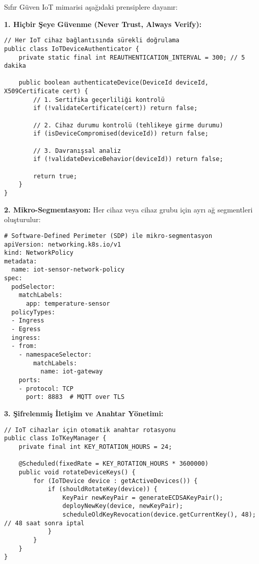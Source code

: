 Sıfır Güven IoT mimarisi aşağıdaki prensiplere dayanır:

\textbf{1. Hiçbir Şeye Güvenme (Never Trust, Always Verify):}
\begin{lstlisting}[breaklines=true,basicstyle=\ttfamily\footnotesize]
// Her IoT cihaz bağlantısında sürekli doğrulama
public class IoTDeviceAuthenticator {
    private static final int REAUTHENTICATION_INTERVAL = 300; // 5 dakika
    
    public boolean authenticateDevice(DeviceId deviceId, X509Certificate cert) {
        // 1. Sertifika geçerliliği kontrolü
        if (!validateCertificate(cert)) return false;
        
        // 2. Cihaz durumu kontrolü (tehlikeye girme durumu)
        if (isDeviceCompromised(deviceId)) return false;
        
        // 3. Davranışsal analiz
        if (!validateDeviceBehavior(deviceId)) return false;
        
        return true;
    }
}
\end{lstlisting}

\textbf{2. Mikro-Segmentasyon:}
Her cihaz veya cihaz grubu için ayrı ağ segmentleri oluşturulur:
\begin{lstlisting}[breaklines=true,basicstyle=\ttfamily\footnotesize]
# Software-Defined Perimeter (SDP) ile mikro-segmentasyon
apiVersion: networking.k8s.io/v1
kind: NetworkPolicy
metadata:
  name: iot-sensor-network-policy
spec:
  podSelector:
    matchLabels:
      app: temperature-sensor
  policyTypes:
  - Ingress
  - Egress
  ingress:
  - from:
    - namespaceSelector:
        matchLabels:
          name: iot-gateway
    ports:
    - protocol: TCP
      port: 8883  # MQTT over TLS
\end{lstlisting}

\textbf{3. Şifrelenmiş İletişim ve Anahtar Yönetimi:}
\begin{lstlisting}[breaklines=true,basicstyle=\ttfamily\footnotesize]
// IoT cihazlar için otomatik anahtar rotasyonu
public class IoTKeyManager {
    private final int KEY_ROTATION_HOURS = 24;
    
    @Scheduled(fixedRate = KEY_ROTATION_HOURS * 3600000)
    public void rotateDeviceKeys() {
        for (IoTDevice device : getActiveDevices()) {
            if (shouldRotateKey(device)) {
                KeyPair newKeyPair = generateECDSAKeyPair();
                deployNewKey(device, newKeyPair);
                scheduleOldKeyRevocation(device.getCurrentKey(), 48); // 48 saat sonra iptal
            }
        }
    }
}
\end{lstlisting}

